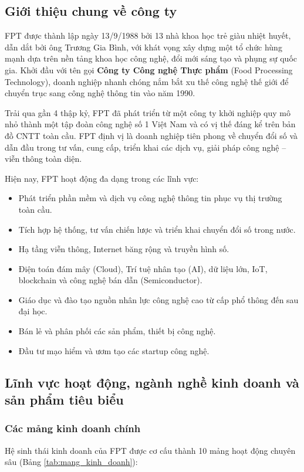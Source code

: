 \subsection{Giới thiệu chung về công ty}
FPT được thành lập ngày 13/9/1988 bởi 13 nhà khoa học trẻ giàu nhiệt huyết, dẫn dắt bởi ông Trương Gia Bình, với khát vọng xây dựng một tổ chức hùng mạnh dựa trên nền tảng khoa học công nghệ, đổi mới sáng tạo và phụng sự quốc gia. Khởi đầu với tên gọi \textbf{Công ty Công nghệ Thực phẩm} (Food Processing Technology), doanh nghiệp nhanh chóng nắm bắt xu thế công nghệ thế giới để chuyển trục sang công nghệ thông tin vào năm 1990.

Trải qua gần 4 thập kỷ, FPT đã phát triển từ một công ty khởi nghiệp quy mô nhỏ thành một tập đoàn công nghệ số 1 Việt Nam và có vị thế đáng kể trên bản đồ CNTT toàn cầu. FPT định vị là doanh nghiệp tiên phong về chuyển đổi số và dẫn đầu trong tư vấn, cung cấp, triển khai các dịch vụ, giải pháp công nghệ -- viễn thông toàn diện.

Hiện nay, FPT hoạt động đa dạng trong các lĩnh vực:
\begin{itemize}[noitemsep]
    \item Phát triển phần mềm và dịch vụ công nghệ thông tin phục vụ thị trường toàn cầu.
    \item Tích hợp hệ thống, tư vấn chiến lược và triển khai chuyển đổi số trong nước.
    \item Hạ tầng viễn thông, Internet băng rộng và truyền hình số.
    \item Điện toán đám mây (Cloud), Trí tuệ nhân tạo (AI), dữ liệu lớn, IoT, blockchain và công nghệ bán dẫn (Semiconductor).
    \item Giáo dục và đào tạo nguồn nhân lực công nghệ cao từ cấp phổ thông đến sau đại học.
    \item Bán lẻ và phân phối các sản phẩm, thiết bị công nghệ.
    \item Đầu tư mạo hiểm và ươm tạo các startup công nghệ.
\end{itemize}

\subsection{Lĩnh vực hoạt động, ngành nghề kinh doanh và sản phẩm tiêu biểu}

\subsubsection{Các mảng kinh doanh chính}
Hệ sinh thái kinh doanh của FPT được cơ cấu thành 10 mảng hoạt động chuyên sâu (Bảng \ref{tab:mang_kinh_doanh}):

